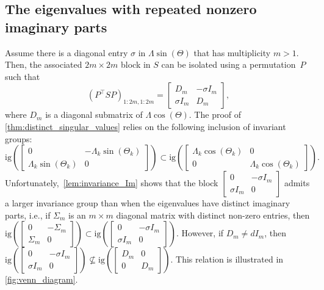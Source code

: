 \documentclass[10pt,twoside,dvipsnames]{siamart1116}
\numberwithin{algorithm}{section}
\numberwithin{equation}{section}
\begin{document}
	\subsection{The eigenvalues with repeated nonzero imaginary parts} \label{subsec:case2}
	Assume there is a diagonal entry $\sigma$ in $\Lambda\sin(\Theta)$ that has multiplicity $m>1$. Then, the associated $2m\times 2m$ block in $S$ can be isolated using a permutation~$P$ such that
	\begin{equation}\label{eq:highlight_multiplicity}
	 (P^\top SP)_{1:2m,1:2m} = 
		\begin{bmatrix}
		D_m&-\sigma I_m\\
		\sigma I_m&D_m
		\end{bmatrix},
	\end{equation}
where $D_m$ is a diagonal submatrix of $\Lambda\cos(\Theta)$. The proof of \cref{thm:distinct_singular_values} relies on the following inclusion of invariant groups: \begin{equation*}
\mathrm{ig}\left(\left[\begin{smallmatrix}
	0&-\Lambda_k\sin(\Theta_k)\\
	 \Lambda_k\sin(\Theta_k)&0
	\end{smallmatrix}\right]\right)\subset \mathrm{ig}\left(\left[\begin{smallmatrix}
		\Lambda_k\cos(\Theta_k)&0\\
		0&\Lambda_k\cos(\Theta_k)
	\end{smallmatrix}\right]\right).
	\end{equation*} Unfortunately,~\cref{lem:invariance_Im} shows that the block $\left[\begin{smallmatrix}
	0&-\sigma I_m\\
	\sigma I_m&0
	\end{smallmatrix}\right]$ admits a larger invariance group than when the eigenvalues have distinct imaginary parts, i.e., if $\Sigma_m$ is an $m\times m$ diagonal matrix with distinct non-zero entries, then $\mathrm{ig}\left(\left[\begin{smallmatrix}
	0&-\Sigma_m\\
	\Sigma_m&0
	\end{smallmatrix}\right]\right)\subset \mathrm{ig}\left(\left[\begin{smallmatrix}
	0&-\sigma I_m\\
	\sigma I_m&0
	\end{smallmatrix}\right]\right) $. However, if $D_m\neq d I_m$, then $\mathrm{ig}\left(\left[\begin{smallmatrix}
	0&-\sigma I_m\\
	\sigma I_m&0
	\end{smallmatrix}\right]\right) \nsubseteq \mathrm{ig}\left( \left[\begin{smallmatrix}D_m&0\\
		0&D_m
	\end{smallmatrix}\right]\right)$. This relation is illustrated in \cref{fig:venn_diagram}.
\end{document}
